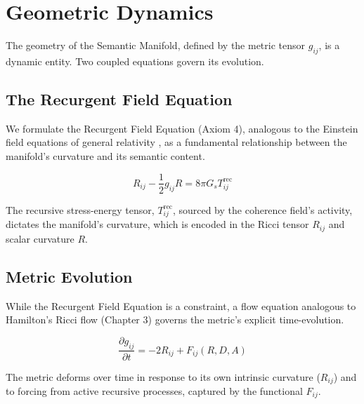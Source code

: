 
\section{Geometric Dynamics}
\label{sec:geometric_dynamics}

The geometry of the Semantic Manifold, defined by the metric tensor \(g_{ij}\), is a dynamic entity. Two coupled equations govern its evolution.


\subsection{The Recurgent Field Equation}
\label{sec:the_recurgent_field_equation}

We formulate the Recurgent Field Equation (Axiom 4), analogous to the Einstein field equations of general relativity \autocite{Einstein1915}, as a fundamental relationship between the manifold's curvature and its semantic content.

\begin{equation}
R_{ij} - \frac{1}{2}g_{ij}R = 8\pi G_s T^{\text{rec}}_{ij}
\end{equation}

The recursive stress-energy tensor, \(T^{\text{rec}}_{ij}\), sourced by the coherence field's activity, dictates the manifold's curvature, which is encoded in the Ricci tensor \(R_{ij}\) and scalar curvature \(R\).


\subsection{Metric Evolution}
\label{sec:metric_evolution}

While the Recurgent Field Equation is a constraint, a flow equation analogous to Hamilton's Ricci flow (Chapter 3) \autocite{Hamilton1982} governs the metric's explicit time-evolution.

\begin{equation}
\frac{\partial g_{ij}}{\partial t} = -2 R_{ij} + F_{ij}(R, D, A)
\end{equation}

The metric deforms over time in response to its own intrinsic curvature (\(R_{ij}\)) and to forcing from active recursive processes, captured by the functional \(F_{ij}\).

